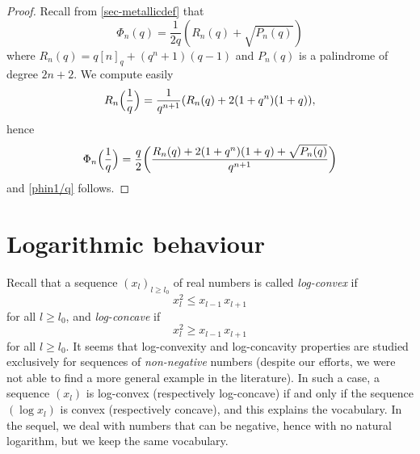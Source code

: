 \documentclass[11pt,reqno]{amsart}
\theoremstyle{plain}
\theoremstyle{definition}
\numberwithin{figure}{section}
\numberwithin{table}{section}
\numberwithin{equation}{section}
\let\fr=\frac
\begin{document}
\begin{proof}
Recall from \cref{sec-metallicdef} that
\begin{equation*}
	\Phi_n(q)=\frac{1}{2q}\left(R_n(q)+\sqrt{P_n(q)}\right)
\end{equation*}
where $R_n(q)=q[n]_q+(q^n+1)(q-1)$ and $P_n(q)$ is a palindrome of degree $2n+2$. We compute easily
\begin{equation*}
R_n\Bigl(\fr 1{q}\Bigr)=\fr 1{q^{n+1}}(R_n(q)+2(1+q^n)(1+q)),
\end{equation*}
hence
\begin{equation*}
\Phi_n\Bigl(\fr 1{q}\Bigr)=\frac{q}{2}\biggl(\fr{R_n(q)+2(1+q^n)(1+q)+\sqrt{P_n(q)}}{q^{n+1}}\biggr)
\end{equation*}
and \eqref{phin1/q} follows.
\end{proof}





















\section{Logarithmic behaviour}\label{sec-log}


Recall that a sequence $(x_l)_{l≥l_0}$ of real numbers is called \emph{log-convex} if 
\begin{equation}\label{log-cvx}
x_l^2≤x_{l-1}\,x_{l+1}
\end{equation} 
for all $l≥l_0$, and \emph{log-concave} if 
\begin{equation}\label{log-ccv}
x_l^2≥x_{l-1}\,x_{l+1}
\end{equation}
for all $l≥l_0$. It seems that log-convexity and log-concavity properties are studied exclusively for sequences of \emph{non-negative} numbers (despite our efforts, we were not able to find a more general example in the literature). In such a case, a sequence $(x_l)$ is log-convex (respectively log-concave) if and only if the sequence $(\log x_l)$ is convex (respectively concave), and this explains the vocabulary. In the sequel, we deal with numbers that can be negative, hence with no natural logarithm, but we keep the same vocabulary.
\end{document}
